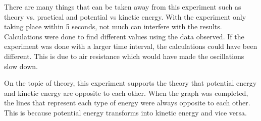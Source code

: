

{There are many things that can be taken away from this experiment such as theory vs. practical and potential vs kinetic energy. With the experiment only taking place within 5 seconds, not much can interfere with the results. Calculations were done to find different values using the data observed. If the experiment was done with a larger time interval, the calculations could have been different. This is due to air resistance which would have made the oscillations slow down.}

{On the topic of theory, this experiment supports the theory that potential energy and kinetic energy are opposite to each other. When the graph was completed, the lines that represent each type of energy were always opposite to each other. This is because potential energy transforms into kinetic energy and vice versa.}

{}

{}

{}

{}

{}

{}

{}

{}


